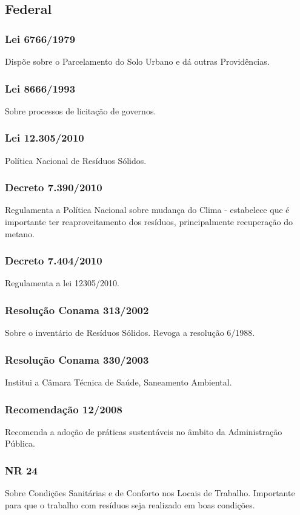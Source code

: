 \begin{subapend}
	\subsection{Federal}
	\begin{subsubapend}
		\item \subsubsection{Lei 6766/1979}
		Dispõe sobre o Parcelamento do Solo Urbano e dá outras Providências.
		\subsubsection{Lei 8666/1993}
		Sobre processos de licitação de governos.
		\subsubsection{Lei 12.305/2010}
		Política Nacional de Resíduos Sólidos.
		\subsubsection{Decreto 7.390/2010}
		Regulamenta a Política Nacional sobre mudança do Clima - estabelece que é importante ter reaproveitamento dos resíduos, principalmente recuperação do metano.
		\subsubsection{Decreto 7.404/2010}
		Regulamenta a lei 12305/2010.
		\subsubsection{Resolução Conama 313/2002}
		Sobre o inventário de Resíduos Sólidos. Revoga a resolução 6/1988.
		\subsubsection{Resolução Conama 330/2003}
		Institui a Câmara Técnica de Saúde, Saneamento Ambiental.
		\subsubsection{Recomendação 12/2008}
		Recomenda a adoção de práticas sustentáveis no âmbito da Administração Pública.
		\subsubsection{NR 24}
		Sobre Condições Sanitárias e de Conforto nos Locais de Trabalho. Importante para que o trabalho com resíduos seja realizado em boas condições.

\end{subsubapend}
\end{subapend}
